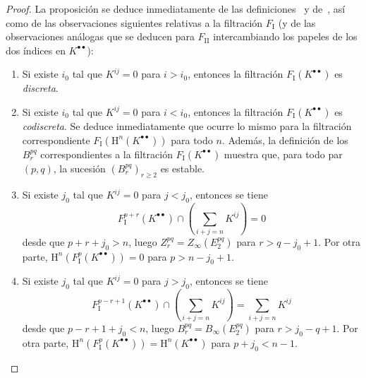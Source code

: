 \documentclass[10pt,oneside,openany]{book}
\theoremstyle{egaenv}\newtheorem*{env}{---}
\theoremstyle{egastatement}
\theoremstyle{egadescription}
\newcommand{\oldpage}[2][]{\marginnote{\normalfont\scriptsize\textbf{#1}\,|\,#2}\ignorespaces}
\renewcommand{\geq}{\geqslant}
\begin{document}
\begin{proof}
La proposición se deduce inmediatamente de las definiciones~ y de~, así como de las observaciones siguientes relativas a la filtración $F_{\mathrm I}$ (y de las observaciones análogas que se deducen para $F_{\mathrm{II}}$ intercambiando los papeles de los dos índices en $K^{\bullet\bullet}$):
\begin{enumerate}
  \item[{$1^\circ$}] Si existe $i_0$ tal que $K^{ij}=0$ para $i>i_0$, entonces la filtración $F_{\mathrm I}(K^{\bullet\bullet})$ es \emph{discreta}.
  \item[{$2^\circ$}] Si existe $i_0$ tal que $K^{ij}=0$ para $i<i_0$, entonces la filtración $F_{\mathrm I}(K^{\bullet\bullet})$ es \emph{codiscreta}.
    Se deduce inmediatamente que ocurre lo mismo para la filtración correspondiente $F_{\mathrm I}(\mathrm H^n(K^{\bullet\bullet}))$ para todo $n$.
    Además, la definición de los $B_r^{pq}$ correspondientes a la filtración $F_{\mathrm I}(K^{\bullet\bullet})$  muestra que, para todo par $(p,q)$, la sucesión $(B_r^{pq})_{r\geq2}$ es estable.
  \item[{$3^\circ$}] Si existe $j_0$ tal que $K^{ij}=0$ para $j<j_0$, entonces se tiene
    \[
      F_{\mathrm I}^{p+r}(K^{\bullet\bullet})
      \cap\left(\sum_{i+j=n}K^{ij}\right)=0
    \]
    desde que $p+r+j_0>n$, luego $Z_r^{pq}=Z_\infty(E_2^{pq})$ para $r>q-j_0+1$.
    Por otra parte, $\mathrm H^n(F_{\mathrm I}^p(K^{\bullet\bullet}))=0$ para $p>n-j_0+1$.
  \item[{$4^\circ$}] Si existe $j_0$ tal que $K^{ij}=0$ para $j>j_0$, entonces se tiene
    \[
      F_{\mathrm I}^{p-r+1}(K^{\bullet\bullet})
      \cap\left(\sum_{i+j=n}K^{ij}\right)=\sum_{i+j=n}K^{ij}
    \]
    \oldpage[0\textsubscript{III}]{31}
    desde que $p-r+1+j_0<n$, luego $B_r^{pq}=B_\infty(E_2^{pq})$ para $r>j_0-q+1$.
    Por otra parte, $\mathrm H^n(F_{\mathrm I}^p(K^{\bullet\bullet}))
    =\mathrm H^n(K^{\bullet\bullet})$ para $p+j_0<n-1$.
\end{enumerate}
\end{proof}
\end{document}
